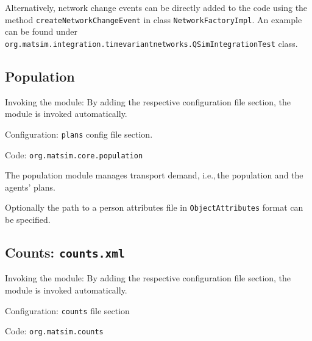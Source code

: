 Alternatively, network change events can be directly added to the code using the method \lstinline|createNetworkChangeEvent| in class \lstinline|NetworkFactoryImpl|. An example can be found under \lstinline|org.matsim.integration.timevariantnetworks.QSimIntegrationTest| class. 
%
%

\subsection{Population}
\label{sec:population}
\begin{compactitem}
\item Invoking the module: By adding the respective configuration file section, the module is invoked automatically.
\item Configuration: \lstinline|plans| config file section. 
\item Code: \lstinline|org.matsim.core.population|
\end{compactitem}

The population module manages transport demand, i.e.,\,the population and the agents' plans.

 Optionally the path to a person attributes file in \lstinline|ObjectAttributes| format can be specified. 

\subsection{Counts: \lstinline|counts.xml|}
\label{sec:counts}
\begin{compactitem}
\item Invoking the module: By adding the respective configuration file section, the module is invoked automatically.
\item Configuration: \lstinline|counts| file section
\item Code: \lstinline|org.matsim.counts|
\end{compactitem}

